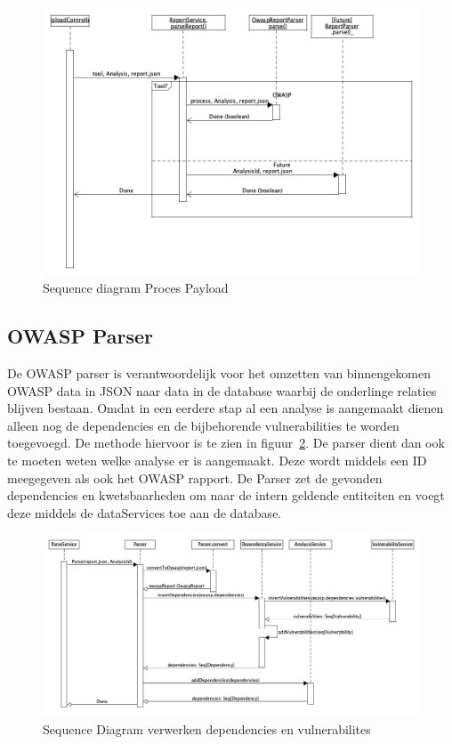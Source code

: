 \begin{figure}[bth]
    \myfloatalign
    \includegraphics[width=12cm]{gfx/umlet/exports/SeqProcessPayload}
    \caption{Sequence diagram Proces Payload}
    \label{fig:ProcesPayload}
\end{figure}

\subsection{OWASP Parser}\label{subsec:owasp-parser}
De OWASP parser is verantwoordelijk voor het omzetten van binnengekomen OWASP data in JSON naar data in de database waarbij de onderlinge relaties blijven bestaan.
Omdat in een eerdere stap al een analyse is aangemaakt dienen alleen nog de dependencies en de bijbehorende vulnerabilities te worden toegevoegd. De methode hiervoor is te zien in figuur~\ref{fig:seqReportParse}.
De parser dient dan ook te moeten weten welke analyse er is aangemaakt. Deze wordt middels een ID meegegeven als ook het OWASP rapport. De Parser zet de gevonden dependencies en kwetsbaarheden om naar de intern geldende entiteiten en voegt deze middels de dataServices toe aan de database.

\begin{figure}[bth]
    \myfloatalign
    \includegraphics[width=12cm]{gfx/umlet/exports/Seq-ParseReport}
    \caption{Sequence Diagram verwerken dependencies en vulnerabilites}
    \label{fig:seqReportParse}
\end{figure}


